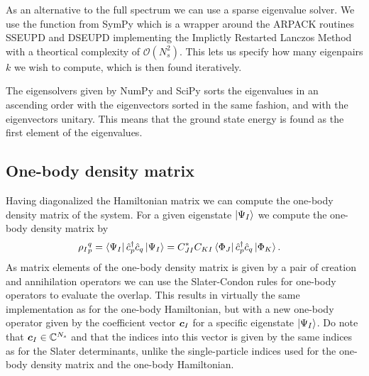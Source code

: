             As an alternative to the full spectrum we can use a sparse
            eigenvalue solver.
            We use the function  from SymPy
            \cite{sympy} which is a wrapper around the ARPACK routines SSEUPD
            and DSEUPD \cite{arpack} implementing the Implictly Restarted
            Lanczos Method with a theortical complexity of $\mathcal{O}(N_s^2)$.
            This lets us specify how many eigenpairs $k$ we wish to compute,
            which is then found iteratively.

            The eigensolvers given by NumPy \cite{numpy} and SciPy \cite{sympy}
            sorts the eigenvalues in an ascending order with the eigenvectors
            sorted in the same fashion, and with the eigenvectors unitary.
            This means that the ground state energy is found as the first
            element of the eigenvalues.

        \subsection{One-body density matrix}
            Having diagonalized the Hamiltonian matrix we can compute the one-body
            density matrix of the system.
            For a given eigenstate $\ket{\Psi_I}$ we compute the one-body
            density matrix by
            \begin{align}
                {\rho_I}^{q}_{p}
                &= \bra{\Psi_I}\hat{c}_{p}^{\dagger}\hat{c}_{q}\ket{\Psi_I}
                = C_{JI}^{*}C_{KI}\bra{\Phi_J}\hat{c}_{p}^{\dagger}\hat{c}_{q}\ket{\Phi_K}.
                \label{eq:ci-one-body-density}
            \end{align}
            As matrix elements of the one-body density matrix is given by a pair
            of creation and annihilation operators we can use the Slater-Condon
            rules for one-body operators to evaluate the overlap.
            This results in virtually the same implementation as for the
            one-body Hamiltonian, but with a new one-body operator given by the
            coefficient vector $\boldsymbol{c}_I$ for a specific eigenstate
            $\ket{\Psi_I}$.
            Do note that $\boldsymbol{c}_I \in \mathbb{C}^{N_s}$ and that the indices
            into this vector is given by the same indices as for the Slater
            determinants, unlike the single-particle indices used for the
            one-body density matrix and the one-body Hamiltonian.


